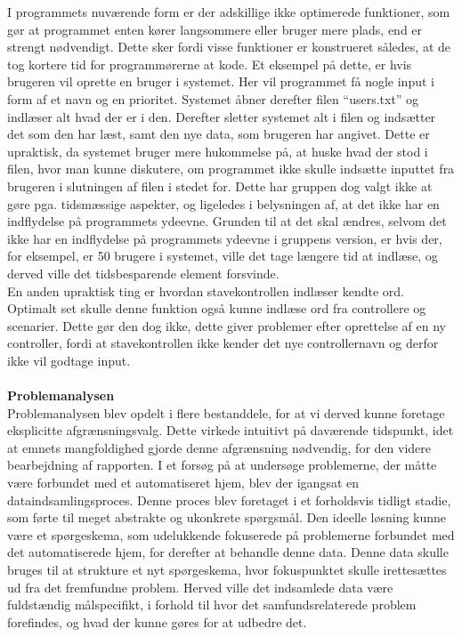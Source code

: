 I programmets nuværende form er der adskillige ikke optimerede funktioner, som gør at programmet enten kører langsommere eller bruger mere plads, end er strengt nødvendigt. Dette sker fordi visse funktioner er konstrueret således, at de tog kortere tid for programmørerne at kode.
Et eksempel på dette, er hvis brugeren vil oprette en bruger i systemet. Her vil programmet få nogle input i form af et navn og en prioritet. Systemet åbner derefter filen “users.txt” og indlæser alt hvad der er i den. Derefter sletter systemet alt i filen og indsætter det som den har læst, samt den nye data, som brugeren har angivet.
Dette er upraktisk, da systemet bruger mere hukommelse på, at huske hvad der stod i filen, hvor man kunne diskutere, om programmet ikke skulle indsætte inputtet fra brugeren i slutningen af filen i stedet for. Dette har gruppen dog valgt ikke at gøre pga. tidsmæssige aspekter, og ligeledes i belysningen af, at det ikke har en indflydelse på programmets ydeevne. Grunden til at det skal ændres, selvom det ikke har en indflydelse på programmets ydeevne i gruppens version, er hvis der, for eksempel, er 50 brugere i systemet, ville det tage længere tid at indlæse, og derved ville det tidsbesparende element forsvinde.\\
En anden upraktisk ting er hvordan stavekontrollen indlæser kendte ord. Optimalt set skulle denne funktion også kunne indlæse ord fra controllere og scenarier. Dette gør den dog ikke, dette giver problemer efter oprettelse af en ny controller, fordi at stavekontrollen ikke kender det nye controllernavn og derfor ikke vil godtage input.
\\\\
{\bf Problemanalysen}\\
Problemanalysen blev opdelt i flere bestanddele, for at vi derved kunne foretage eksplicitte afgrænsningsvalg. Dette virkede intuitivt på daværende tidspunkt, idet at emnets mangfoldighed gjorde denne afgrænsning nødvendig, for den videre bearbejdning af rapporten. I et forsøg på at undersøge problemerne, der måtte være forbundet med et automatiseret hjem, blev der igangsat en dataindsamlingsproces. Denne proces blev foretaget i et forholdsvis tidligt stadie, som førte til meget abstrakte og ukonkrete spørgsmål. Den ideelle løsning kunne være et spørgeskema, som udelukkende fokuserede på problemerne forbundet med det automatiserede hjem, for derefter at behandle denne data. Denne data skulle bruges til at strukture et nyt spørgeskema, hvor fokuspunktet skulle irettesættes ud fra det fremfundne problem. Herved ville det indsamlede data være fuldstændig målspecifikt, i forhold til hvor det samfundsrelaterede problem forefindes, og hvad der kunne gøres for at udbedre det.
